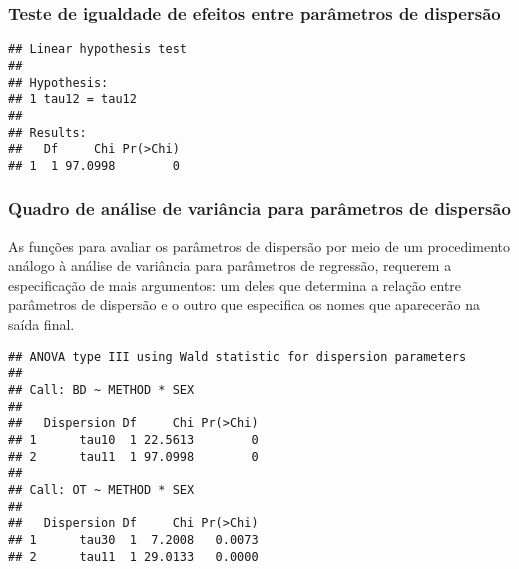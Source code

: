 \subsubsection{Teste de igualdade de efeitos entre parâmetros de dispersão}

\begin{knitrout}
\color{fgcolor}\begin{kframe}
\begin{alltt}
\hlstd{(} 
                      \hlstd{=} \hlstd{(}\hlstd{))}
\end{alltt}
\begin{verbatim}
## Linear hypothesis test
## 
## Hypothesis:               
## 1 tau12 = tau12
## 
## Results:
##   Df     Chi Pr(>Chi)
## 1  1 97.0998        0
\end{verbatim}
\end{kframe}
\end{knitrout}

\subsubsection{Quadro de análise de variância para parâmetros de dispersão}

As funções para avaliar os parâmetros de dispersão por meio de um procedimento análogo à análise de variância para parâmetros de regressão, requerem a especificação de mais argumentos: um deles que determina a relação entre parâmetros de dispersão e o outro que especifica os nomes que aparecerão na saída final.


\begin{knitrout}
\color{fgcolor}\begin{kframe}
\begin{alltt}
               \hlstd{=} \hlstd{(}\hlstd{(}\hlstd{,}\hlstd{),} \hlstd{(}\hlstd{,}\hlstd{)),}
               \hlstd{=} \hlstd{(}\hlstd{(}\hlstd{,} \hlstd{),}
                           \hlstd{(}\hlstd{,} \hlstd{)))}
\end{alltt}
\begin{verbatim}
## ANOVA type III using Wald statistic for dispersion parameters
## 
## Call: BD ~ METHOD * SEX
## 
##   Dispersion Df     Chi Pr(>Chi)
## 1      tau10  1 22.5613        0
## 2      tau11  1 97.0998        0
## 
## Call: OT ~ METHOD * SEX
## 
##   Dispersion Df     Chi Pr(>Chi)
## 1      tau30  1  7.2008   0.0073
## 2      tau11  1 29.0133   0.0000
\end{verbatim}
\end{kframe}
\end{knitrout}

